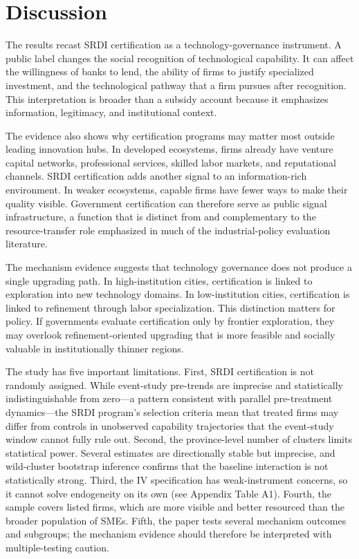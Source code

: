 \documentclass[12pt]{article}
\begin{document}
\section{Discussion}

The results recast SRDI certification as a technology-governance instrument. A public label changes the social recognition of technological capability. It can affect the willingness of banks to lend, the ability of firms to justify specialized investment, and the technological pathway that a firm pursues after recognition. This interpretation is broader than a subsidy account because it emphasizes information, legitimacy, and institutional context.

The evidence also shows why certification programs may matter most outside leading innovation hubs. In developed ecosystems, firms already have venture capital networks, professional services, skilled labor markets, and reputational channels. SRDI certification adds another signal to an information-rich environment. In weaker ecosystems, capable firms have fewer ways to make their quality visible. Government certification can therefore serve as public signal infrastructure, a function that is distinct from and complementary to the resource-transfer role emphasized in much of the industrial-policy evaluation literature.

The mechanism evidence suggests that technology governance does not produce a single upgrading path. In high-institution cities, certification is linked to exploration into new technology domains. In low-institution cities, certification is linked to refinement through labor specialization. This distinction matters for policy. If governments evaluate certification only by frontier exploration, they may overlook refinement-oriented upgrading that is more feasible and socially valuable in institutionally thinner regions.

The study has five important limitations. First, SRDI certification is not randomly assigned. While event-study pre-trends are imprecise and statistically indistinguishable from zero---a pattern consistent with parallel pre-treatment dynamics---the SRDI program's selection criteria mean that treated firms may differ from controls in unobserved capability trajectories that the event-study window cannot fully rule out. Second, the province-level number of clusters limits statistical power. Several estimates are directionally stable but imprecise, and wild-cluster bootstrap inference confirms that the baseline interaction is not statistically strong. Third, the IV specification has weak-instrument concerns, so it cannot solve endogeneity on its own (see Appendix Table A1). Fourth, the sample covers listed firms, which are more visible and better resourced than the broader population of SMEs. Fifth, the paper tests several mechanism outcomes and subgroups; the mechanism evidence should therefore be interpreted with multiple-testing caution.
\end{document}
